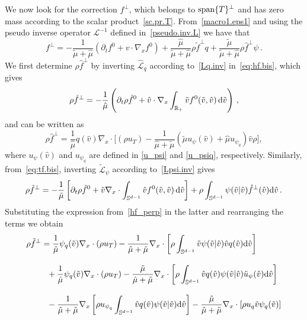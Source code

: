 \documentclass[a4paper]{article}
\theoremstyle{Theorem}\newtheorem{proposition}{Proposition}[section]
\theoremstyle{Remark}\newtheorem{remark}{Remark}[section]
\theoremstyle{Theorem}\newtheorem{theorem}{Theorem}[section]
\newcommand{\R}{\mathbb{R}}
\newcommand{\hv}{\hat{v}}
\newcommand{\tv}{\tilde{v}}
\newcommand{\hf}{\hat{f}}
\newcommand{\tf}{\tilde{f}}
\newcommand{\hmu}{\hat{\mu}}
\newcommand{\tmu}{\tilde{\mu}}
\newcommand{\intS}{\int_{\mathbb{S}^{d-1}}}
\newcommand{\intR}{\int_{\R_+}}
\begin{document}
We now look for the correction $f^{\bot}$, which belongs to ${\rm span} \lbrace T\rbrace^{\perp}$ and has zero mass according to the scalar product~\eqref{sc.pr.T}. From~\eqref{macro1.eps1} and using the pseudo inverse operator $\mathcal{L}^{-1}$ defined in~\eqref{pseudo.inv.L} we have that
\begin{equation}\label{f_perp.1}
    f^{\bot} = - \dfrac{1}{\tmu+\hmu} \left(\partial_t f^0 + v\cdot \nabla_x f^0\right) +\dfrac{\hmu}{\tmu+\hmu} \rho \tf^{\bot}q+\dfrac{\tmu}{\tmu+\hmu} \rho \hf^{\bot}\psi\,. 
\end{equation}
We first determine $\rho \hf^{\bot}$ by inverting $\hat{\mathcal{L}}_q$ according to~\eqref{Lq.inv} in~\eqref{eq:hf.bis}, which gives
\begin{equation*}
 \rho \hf^{\bot}=-\dfrac{1}{\hmu} \left(\partial_t \rho \hf^0 + \hv \cdot \nabla_x \intR \tv f^0(\tv,\hv) \, {\rm d} \tv \right)\,, 
\end{equation*} 
and can be written as
\begin{equation}\label{hf_perp}
 \rho \hf^{\bot}=\dfrac{1}{\hmu}q(\hv) \nabla_x \cdot \Big[\left(\rho u_T\right)  - \dfrac{1}{\hmu+\tmu}\left(\tmu u_\psi(\hv)+\hmu u_{\psi_q}\right) \hv\rho \Big],     
\end{equation}
where $u_\psi(\hv)$ and $u_{\psi_q}$ are defined in \eqref{u_psi} and \eqref{u_psiq}, respectively. Similarly, from~\eqref{eq:tf.bis}, inverting $\tilde{\mathcal{L}}_{\psi}$ according to~\eqref{Lpsi.inv} gives
\begin{equation*}
    \rho \tf^{\bot} = -\dfrac{1}{\tmu} \left[\partial_t \rho \tf^0 + \tv \nabla_x \cdot \intS \hv f^0(\tv,\hv) \, {\rm d} \hv\right] +\rho\intS\psi(\tv|\hv)\hf^{\bot}(\hv){\rm d}\hv\,.
\end{equation*}
Substituting the expression from~\eqref{hf_perp} in the latter and rearranging the terms we obtain
\begin{equation}\label{tf_perp}
\begin{split}
    \rho \tf^{\bot} &= \dfrac{1}{\tmu}\psi_q(\tv) \nabla_x \cdot (\rho u_T) -\dfrac{1}{\hmu+\tmu} \nabla_x \cdot\left[\rho\intS \tv\psi(\tv|\hv)\hv q(\hv){\rm d}\hv\right]\\[0.3cm]
    &\,\,\,\,+\dfrac{1}{\hmu}\psi_q(\tv) \nabla_x \cdot (\rho u_T) -\dfrac{\tmu}{\hmu+\tmu}\nabla_x\cdot\left[\rho\intS\hv q(\hv)\psi(\tv|\hv)\tilde{u}_{\psi}(\hv){\rm d}\hv\right]\\[0.3cm]
    &\,\,\,\,-\dfrac{1}{\hmu+\tmu}\nabla_x\left[\rho u_{\psi_q}\intS\hv q(\hv)\psi(\tv|\hv){\rm d}\hv\right] - \dfrac{\hmu}{\hmu+\tmu}\nabla_x\cdot \left[\rho u_q\tv\psi_q(\tv)\right]
    \end{split}
\end{equation}
\end{document}
